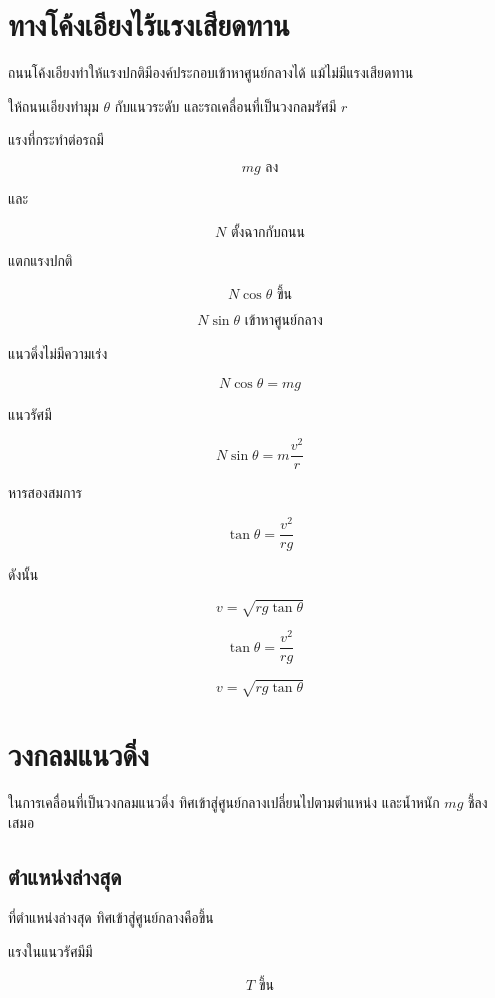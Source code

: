 \section{ทางโค้งเอียงไร้แรงเสียดทาน}

ถนนโค้งเอียงทำให้แรงปกติมีองค์ประกอบเข้าหาศูนย์กลางได้ แม้ไม่มีแรงเสียดทาน

ให้ถนนเอียงทำมุม $\theta$ กับแนวระดับ และรถเคลื่อนที่เป็นวงกลมรัศมี $r$

แรงที่กระทำต่อรถมี

\[
mg \text{ ลง}
\]

และ

\[
N \text{ ตั้งฉากกับถนน}
\]

แตกแรงปกติ

\[
N\cos\theta \text{ ขึ้น}
\]

\[
N\sin\theta \text{ เข้าหาศูนย์กลาง}
\]

แนวดิ่งไม่มีความเร่ง

\[
N\cos\theta=mg
\]

แนวรัศมี

\[
N\sin\theta=m\frac{v^2}{r}
\]

หารสองสมการ

\[
\tan\theta=\frac{v^2}{rg}
\]

ดังนั้น

\[
v=\sqrt{rg\tan\theta}
\]

\begin{tcolorbox}[title=ทางโค้งเอียงไร้แรงเสียดทาน]
\[
\tan\theta=\frac{v^2}{rg}
\]

\[
v=\sqrt{rg\tan\theta}
\]
\end{tcolorbox}

\section{วงกลมแนวดิ่ง}

ในการเคลื่อนที่เป็นวงกลมแนวดิ่ง ทิศเข้าสู่ศูนย์กลางเปลี่ยนไปตามตำแหน่ง และน้ำหนัก $mg$ ชี้ลงเสมอ

\subsection{ตำแหน่งล่างสุด}

ที่ตำแหน่งล่างสุด ทิศเข้าสู่ศูนย์กลางคือขึ้น

แรงในแนวรัศมีมี

\[
T \text{ ขึ้น}
\]

